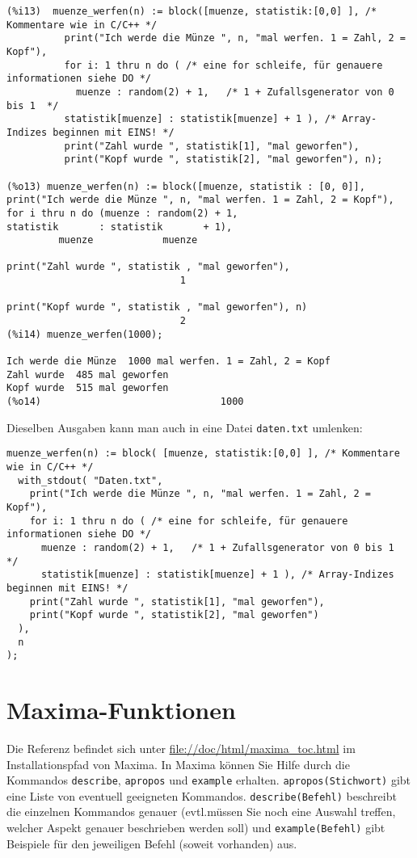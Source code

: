 \documentclass[ngerman,12pt]{scrartcl}
\begin{document}
\begin{verbatim}
(%i13)  muenze_werfen(n) := block([muenze, statistik:[0,0] ], /* Kommentare wie in C/C++ */
          print("Ich werde die Münze ", n, "mal werfen. 1 = Zahl, 2 = Kopf"),
          for i: 1 thru n do ( /* eine for schleife, für genauere informationen siehe DO */
            muenze : random(2) + 1,   /* 1 + Zufallsgenerator von 0 bis 1  */
          statistik[muenze] : statistik[muenze] + 1 ), /* Array-Indizes beginnen mit EINS! */
          print("Zahl wurde ", statistik[1], "mal geworfen"),
          print("Kopf wurde ", statistik[2], "mal geworfen"), n);

(%o13) muenze_werfen(n) := block([muenze, statistik : [0, 0]],
print("Ich werde die Münze ", n, "mal werfen. 1 = Zahl, 2 = Kopf"),
for i thru n do (muenze : random(2) + 1,
statistik       : statistik       + 1),
         muenze            muenze

print("Zahl wurde ", statistik , "mal geworfen"),
                              1

print("Kopf wurde ", statistik , "mal geworfen"), n)
                              2
(%i14) muenze_werfen(1000);

Ich werde die Münze  1000 mal werfen. 1 = Zahl, 2 = Kopf
Zahl wurde  485 mal geworfen
Kopf wurde  515 mal geworfen
(%o14)                               1000
\end{verbatim}

Dieselben Ausgaben kann man auch in eine Datei \texttt{daten.txt} umlenken:

\begin{verbatim}
muenze_werfen(n) := block( [muenze, statistik:[0,0] ], /* Kommentare wie in C/C++ */
  with_stdout( "Daten.txt",
    print("Ich werde die Münze ", n, "mal werfen. 1 = Zahl, 2 = Kopf"),
    for i: 1 thru n do ( /* eine for schleife, für genauere informationen siehe DO */
      muenze : random(2) + 1,   /* 1 + Zufallsgenerator von 0 bis 1  */
      statistik[muenze] : statistik[muenze] + 1 ), /* Array-Indizes beginnen mit EINS! */
    print("Zahl wurde ", statistik[1], "mal geworfen"),
    print("Kopf wurde ", statistik[2], "mal geworfen")
  ),
  n
);
\end{verbatim}

\section{Maxima-Funktionen}

Die Referenz befindet sich unter \url{file://doc/html/maxima_toc.html} im
Installationspfad von Maxima. In Maxima können  Sie Hilfe durch die
Kommandos \texttt{describe}, \texttt{apropos} und  \texttt{example}
erhalten. \texttt{apropos(Stichwort)} gibt eine  Liste von eventuell
geeigneten Kommandos. \texttt{describe(Befehl)} beschreibt  die
einzelnen Kommandos genauer (evtl.\@ müssen Sie noch eine Auswahl treffen,
welcher Aspekt genauer beschrieben werden soll) und
\texttt{example(Befehl)} gibt Beispiele für den jeweiligen Befehl
(soweit vorhanden) aus.
\end{document}

